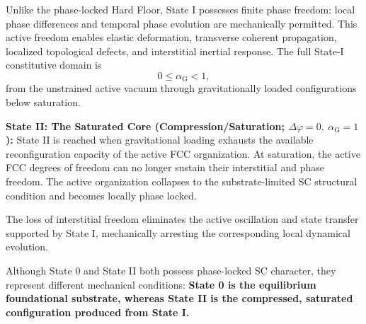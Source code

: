 Unlike the phase-locked Hard Floor, State I possesses finite phase freedom: local phase differences and temporal phase evolution are mechanically permitted. This active freedom enables elastic deformation, transverse coherent propagation, localized topological defects, and interstitial inertial response. The full State-I constitutive domain is
\begin{equation}
    0 \leq \alpha_{\mathrm{G}} < 1,
\end{equation}
from the unstrained active vacuum through gravitationally loaded configurations below saturation.

\noindent\textbf{State II: The Saturated Core (Compression/Saturation; $\Delta\varphi=0,\ \alpha_{\mathrm{G}}=1$):} State II is reached when gravitational loading exhausts the available reconfiguration capacity of the active FCC organization. At saturation, the active FCC degrees of freedom can no longer sustain their interstitial and phase freedom. The active organization collapses to the substrate-limited SC structural condition and becomes locally phase locked.

The loss of interstitial freedom eliminates the active oscillation and state transfer supported by State I, mechanically arresting the corresponding local dynamical evolution.

Although State 0 and State II both possess phase-locked SC character, they represent different mechanical conditions: \textbf{State 0 is the equilibrium foundational substrate, whereas State II is the compressed, saturated configuration produced from State I.}

